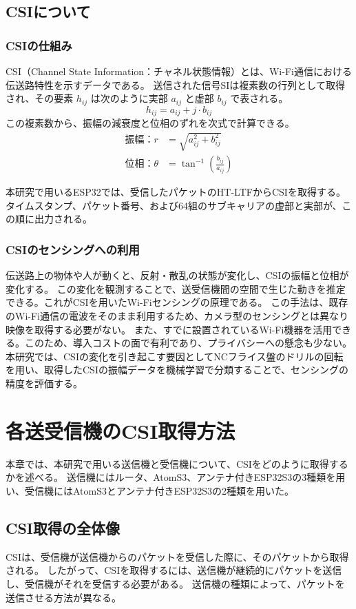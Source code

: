 \documentclass[uplatex, 12pt]{ujbook}
\begin{document}
\section{CSIについて}
\subsection{CSIの仕組み}
CSI（Channel State Information：チャネル状態情報）とは、Wi-Fi通信における伝送路特性を示すデータである。
送信された信号SIは複素数の行列として取得され、その要素 $h_{ij}$ は次のように実部 $a_{ij}$ と虚部 $b_{ij}$ で表される。
\begin{equation}
h_{ij} = a_{ij} + j·b_{ij}
\end{equation}
この複素数から、振幅の減衰度と位相のずれを次式で計算できる。
\begin{align}
振幅：r &= \sqrt{a_{ij}^2 + b_{ij}^2}\\
位相：\theta &= \tan^{-1}\left(\frac{b_{ij}}{a_{ij}}\right)
\end{align}

本研究で用いるESP32では、受信したパケットのHT-LTFからCSIを取得する。タイムスタンプ、パケット番号、および64組のサブキャリアの虚部と実部が、この順に出力される。
\subsection{CSIのセンシングへの利用}
伝送路上の物体や人が動くと、反射・散乱の状態が変化し、CSIの振幅と位相が変化する。
この変化を観測することで、送受信機間の空間で生じた動きを推定できる。これがCSIを用いたWi-Fiセンシングの原理である。
この手法は、既存のWi-Fi通信の電波をそのまま利用するため、カメラ型のセンシングとは異なり映像を取得する必要がない。
また、すでに設置されているWi-Fi機器を活用できる。このため、導入コストの面で有利であり、プライバシーへの懸念も少ない。
本研究では、CSIの変化を引き起こす要因としてNCフライス盤のドリルの回転を用い、取得したCSIの振幅データを機械学習で分類することで、センシングの精度を評価する。


\chapter{各送受信機のCSI取得方法}
本章では、本研究で用いる送信機と受信機について、CSIをどのように取得するかを述べる。
送信機にはルータ、AtomS3、アンテナ付きESP32S3の3種類を用い、受信機にはAtomS3とアンテナ付きESP32S3の2種類を用いた。

\section{CSI取得の全体像}
CSIは、受信機が送信機からのパケットを受信した際に、そのパケットから取得される。
したがって、CSIを取得するには、送信機が継続的にパケットを送信し、受信機がそれを受信する必要がある。
送信機の種類によって、パケットを送信させる方法が異なる。
\end{document}
